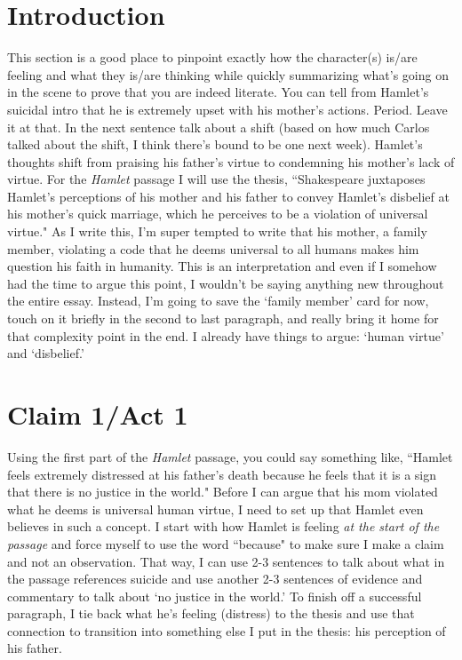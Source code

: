 \documentclass[11pt]{article}
\begin{document}
\section{Introduction}
This section is a good place to pinpoint exactly how the character(s) is/are feeling and what they is/are thinking while quickly summarizing what's going on in the scene to prove that you are indeed literate.
You can tell from Hamlet's suicidal intro that he is extremely upset with his mother's actions. Period. Leave it at that.
In the next sentence talk about a shift (based on how much Carlos talked about the shift, I think there's bound to be one next week).
Hamlet's thoughts shift from praising his father's virtue to condemning his mother's lack of virtue.
For the \textit{Hamlet} passage I will use the thesis, \color{blue} ``Shakespeare juxtaposes Hamlet's perceptions of his mother and his father to convey Hamlet's disbelief at his mother's quick marriage, which he perceives to be a violation of universal virtue."
\color{black} As I write this, I'm super tempted to write that his mother, a family member, violating a code that he deems universal to all humans makes him question his faith in humanity.
This is an interpretation and even if I somehow had the time to argue this point, I wouldn't be saying anything new throughout the entire essay.
Instead, I'm going to save the `family member' card for now, touch on it briefly in the second to last paragraph, and really bring it home for that complexity point in the end.
I already have things to argue: `human virtue' and `disbelief.' 

\section{Claim 1/Act 1}
Using the first part of the \textit{Hamlet} passage, you could say something like, \color{blue}``Hamlet feels extremely distressed at his father's death because he feels that it is a sign that there is no justice in the world."
\color{black} Before I can argue that his mom violated what he deems is universal human virtue, I need to set up that Hamlet even believes in such a concept.
I start with how Hamlet is feeling \textit{at the start of the passage} and force myself to use the word ``because" to make sure I make a claim and not an observation. 
That way, I can use 2-3 sentences to talk about what in the passage references suicide and use another 2-3 sentences of evidence and commentary to talk about `no justice in the world.'
\color{blue} To finish off a successful paragraph, I tie back what he's feeling (distress) to the thesis and use that connection to transition into something else I put in the thesis: his perception of his father.\\
\color{black}
\end{document}

